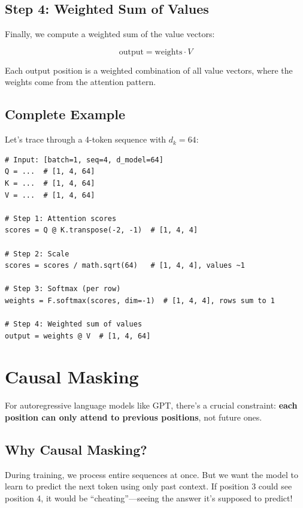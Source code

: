 \subsection{Step 4: Weighted Sum of Values}

Finally, we compute a weighted sum of the value vectors:

\[
\text{output} = \text{weights} \cdot V
\]

Each output position is a weighted combination of all value vectors, where the weights come from the attention pattern.

\subsection{Complete Example}

Let's trace through a 4-token sequence with $d_k = 64$:

\begin{lstlisting}[style=python]
# Input: [batch=1, seq=4, d_model=64]
Q = ...  # [1, 4, 64]
K = ...  # [1, 4, 64]
V = ...  # [1, 4, 64]

# Step 1: Attention scores
scores = Q @ K.transpose(-2, -1)  # [1, 4, 4]

# Step 2: Scale
scores = scores / math.sqrt(64)   # [1, 4, 4], values ~1

# Step 3: Softmax (per row)
weights = F.softmax(scores, dim=-1)  # [1, 4, 4], rows sum to 1

# Step 4: Weighted sum of values
output = weights @ V  # [1, 4, 64]
\end{lstlisting}

\section{Causal Masking}

For autoregressive language models like GPT, there's a crucial constraint: \textbf{each position can only attend to previous positions}, not future ones.

\subsection{Why Causal Masking?}

During training, we process entire sequences at once. But we want the model to learn to predict the next token using only past context. If position 3 could see position 4, it would be ``cheating''---seeing the answer it's supposed to predict!

